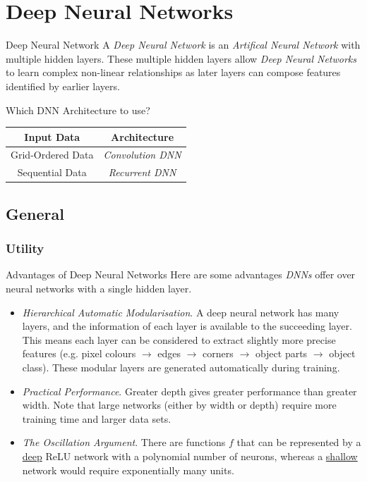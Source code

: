 \documentclass[11pt,a4paper]{article}
\begin{document}
\section{Deep Neural Networks} \label{sec_DeepNeuralNetworks}

  \begin{definition}{Deep Neural Network}
    A \textit{Deep Neural Network} is an \textit{Artifical Neural Network} with multiple hidden layers. These multiple hidden layers allow \textit{Deep Neural Networks} to learn complex non-linear relationships as later layers can compose features identified by earlier layers.
  \end{definition}

  \begin{remark}{Which DNN Architecture to use?}
    \begin{center}
      \begin{tabular}{|c|c|}
        \hline
        \textbf{Input Data}&\textbf{Architecture}\\\hline
        Grid-Ordered Data&\textit{Convolution DNN}\\\hline
        Sequential Data&\textit{Recurrent DNN}\\\hline
      \end{tabular}
    \end{center}
  \end{remark}

\subsection{General} \label{sec_DNNGeneral}

\subsubsection{Utility} \label{sec_DNNUtility}

  \begin{remark}{Advantages of Deep Neural Networks}
    Here are some advantages \textit{DNNs} offer over neural networks with a single hidden layer.
    \begin{itemize}
      \item \textit{Hierarchical Automatic Modularisation}. A deep neural network has many layers, and the information of each layer is available to the succeeding layer. This means each layer can be considered to extract slightly more precise features (e.g. pixel colours $\to$ edges $\to$ corners $\to$ object parts $\to$ object class). These modular layers are generated automatically during training.
      \item \textit{Practical Performance}. Greater depth gives greater performance than greater width. Note that large networks (either by width or depth) require more training time and larger data sets.
      \item \textit{The Oscillation Argument}. There are functions $f$ that can be represented by a \underline{deep} ReLU network with a polynomial number of neurons, whereas a \underline{shallow} network would require exponentially many units.
    \end{itemize}
  \end{remark}
\end{document}
